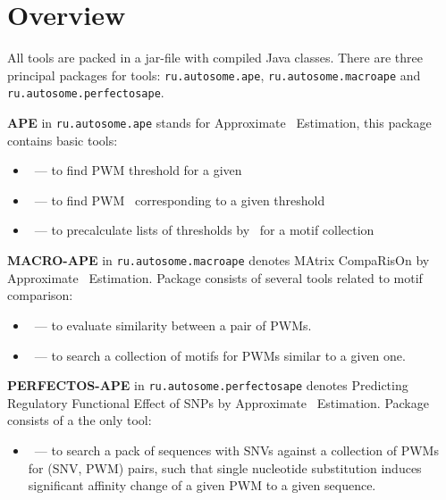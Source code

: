\section{Overview}
All tools are packed in a jar-file with compiled Java classes. There are three principal packages for tools:
\texttt{ru.autosome.ape}, \texttt{ru.autosome.macroape} and \texttt{ru.autosome.perfectosape}.

\textbf{APE} in \texttt{ru.autosome.ape} stands for Approximate \pvalue\ Estimation, this package contains basic tools:
\begin{itemize}
\item {}~--- to find PWM threshold for a given \pvalue
\item {}~--- to find PWM \pvalue\ corresponding to a given threshold
\item {}~--- to precalculate lists of thresholds by \pvalues\ for a motif collection
\end{itemize}

\textbf{MACRO-APE} in \texttt{ru.autosome.macroape} denotes MAtrix CompaRisOn by Approximate \pvalue\ Estimation. Package consists of several tools related to motif comparison:
\begin{itemize}
\item {}~--- to evaluate similarity between a pair of PWMs.
\item {}~--- to search a collection of motifs for PWMs similar to a given one.
\end{itemize}

\textbf{PERFECTOS-APE} in \texttt{ru.autosome.perfectosape} denotes Predicting Regulatory Functional Effect of SNPs by Approximate \pvalue\ Estimation. Package consists of a the only tool:
\begin{itemize}
\item{}~--- to search a pack of sequences with SNVs against a collection of PWMs for (SNV, PWM) pairs, such that single nucleotide substitution induces significant affinity change of a given PWM to a given sequence.
\end{itemize}
